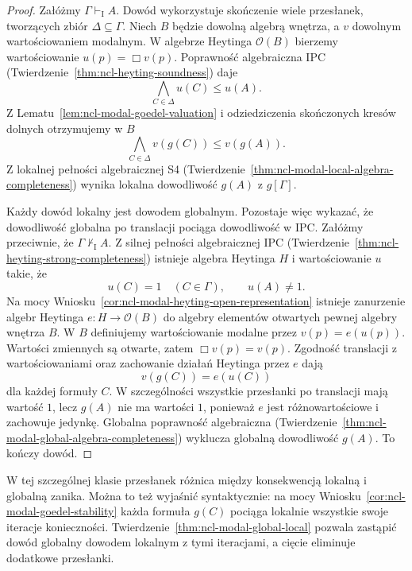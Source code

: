 \begin{proof}
Załóżmy $\Gamma\vdash_{\mathrm I}A$.
Dowód wykorzystuje skończenie wiele przesłanek,
tworzących zbiór $\Delta\subseteq\Gamma$.
Niech $B$ będzie dowolną algebrą wnętrza,
a $v$ dowolnym wartościowaniem modalnym.
W algebrze Heytinga $\mathcal O(B)$ bierzemy
wartościowanie $u(p)=\Box v(p)$.
Poprawność algebraiczna IPC
(Twierdzenie~\ref{thm:ncl-heyting-soundness})
daje
\[
 \bigwedge_{C\in\Delta}u(C)\leq u(A).
\]
Z Lematu~\ref{lem:ncl-modal-goedel-valuation}
i odziedziczenia skończonych kresów dolnych
otrzymujemy w $B$
\[
 \bigwedge_{C\in\Delta}v(g(C))\leq v(g(A)).
\]
Z lokalnej pełności algebraicznej S4
(Twierdzenie~\ref{thm:ncl-modal-local-algebra-completeness})
wynika lokalna dowodliwość $g(A)$ z $g[\Gamma]$.

Każdy dowód lokalny jest dowodem globalnym.
Pozostaje więc wykazać, że dowodliwość globalna
po translacji pociąga dowodliwość w IPC.
Załóżmy przeciwnie, że
$\Gamma\nvdash_{\mathrm I}A$.
Z silnej pełności algebraicznej IPC
(Twierdzenie~\ref{thm:ncl-heyting-strong-completeness})
istnieje algebra Heytinga $H$ i wartościowanie
$u$ takie, że
\[
 u(C)=1\quad(C\in\Gamma),\qquad u(A)\ne1.
\]
Na mocy Wniosku~\ref{cor:ncl-modal-heyting-open-representation}
istnieje zanurzenie algebr Heytinga
$e:H\to\mathcal O(B)$ do algebry elementów
otwartych pewnej algebry wnętrza $B$.
W $B$ definiujemy wartościowanie modalne przez
$v(p)=e(u(p))$. Wartości zmiennych są otwarte,
zatem $\Box v(p)=v(p)$.
Zgodność translacji z wartościowaniami
oraz zachowanie działań Heytinga przez $e$ dają
\[
 v(g(C))=e(u(C))
\]
dla każdej formuły $C$.
W szczególności wszystkie przesłanki po
translacji mają wartość $1$, lecz $g(A)$
nie ma wartości $1$, ponieważ $e$ jest
różnowartościowe i zachowuje jedynkę.
Globalna poprawność algebraiczna
(Twierdzenie~\ref{thm:ncl-modal-global-algebra-completeness})
wyklucza globalną dowodliwość $g(A)$.
To kończy dowód.
\end{proof}
W tej szczególnej klasie przesłanek różnica
między konsekwencją lokalną i globalną
zanika. Można to też wyjaśnić syntaktycznie:
na mocy Wniosku~\ref{cor:ncl-modal-goedel-stability}
każda formuła $g(C)$ pociąga lokalnie
wszystkie swoje iteracje konieczności.
Twierdzenie~\ref{thm:ncl-modal-global-local}
pozwala zastąpić dowód globalny dowodem
lokalnym z tymi iteracjami, a cięcie eliminuje
dodatkowe przesłanki.

